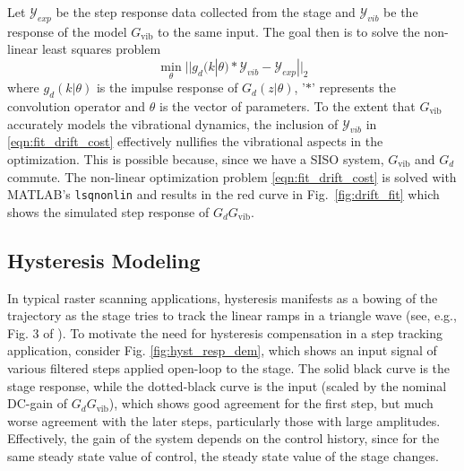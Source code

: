 \documentclass[twocolumn,twoside]{IEEEtran}
\newcommand{\Gv}{\ensuremath{G_{\text{vib}}}\xspace}
\begin{document}
Let $\mathcal{Y}_{exp}$ be the step response data collected from the stage and  $\mathcal{Y}_{vib}$ be the response of the model $\Gv$ to the same input. The goal then is to solve the non-linear least squares problem
\begin{equation}
  \min_{\theta}|| g_d(k|\theta)*\mathcal{Y}_{vib} - \mathcal{Y}_{exp}||_2
  \label{eqn:fit_drift_cost}
\end{equation}
where $g_d(k|\theta)$ is the impulse response of $G_d(z|\theta)$, '$*$' represents the convolution operator and  $\theta$ is the vector of parameters. To the extent that $\Gv$ accurately models the vibrational dynamics, the inclusion of $\mathcal{Y}_{vib}$ in \eqref{eqn:fit_drift_cost} effectively nullifies the vibrational aspects in the optimization. This is possible because, since we have a SISO system, $\Gv$ and $G_d$ commute. 
The non-linear optimization problem \eqref{eqn:fit_drift_cost} is solved with MATLAB's \texttt{lsqnonlin} and results in the red curve in Fig.~\ref{fig:drift_fit} which shows the simulated step response of $G_d\Gv$. 


\subsection{Hysteresis Modeling}\label{sec:hyst_model}
In typical raster scanning applications, hysteresis manifests as a bowing of the trajectory as the stage tries to track the linear ramps in a triangle wave (see, e.g., Fig. 3 of \cite{Leang_IEEECS_2009}). To motivate the need for hysteresis compensation in a step tracking application, consider Fig. \ref{fig:hyst_resp_dem}, which shows an input signal of various filtered steps applied open-loop to the stage. The solid black curve is the stage response, while the dotted-black curve is the input (scaled by the nominal DC-gain of $G_d\Gv$), which shows good agreement for the first step, but much worse agreement with the later steps, particularly those with large amplitudes. Effectively, the gain of the system depends on the control history, since for the same steady state value of control, the steady state value of the stage changes.
\end{document}
